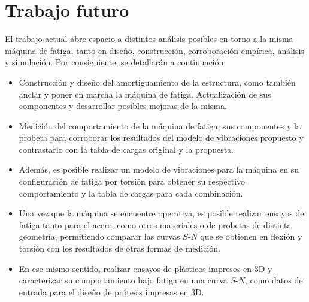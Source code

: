 \section{Trabajo futuro}
El trabajo actual abre espacio a distintos análisis posibles en torno a la misma máquina de fatiga, tanto en diseño, construcción, corroboración empírica, análisis y simulación. Por consiguiente, se detallarán a continuación:
\begin{itemize}
	\item Construcción y diseño del amortiguamiento de la estructura, como también anclar y poner en marcha la máquina de fatiga. Actualización de sus componentes y desarrollar posibles mejoras de la misma.
	\item Medición del comportamiento de la máquina de fatiga, sus componentes y la probeta para corroborar los resultados del modelo de vibraciones propuesto y contrastarlo con la tabla de cargas original y la propuesta.
	\item Además, es posible realizar un modelo de vibraciones para la máquina en su configuración de fatiga por torsión para obtener su respectivo comportamiento y la tabla de cargas para cada combinación.
	\item Una vez que la máquina se encuentre operativa, es posible realizar ensayos de fatiga tanto para el acero, como otros materiales o de probetas de distinta geometría, permitiendo comparar las curvas $S$-$N$ que se obtienen en flexión y torsión con los resultados de otras formas de medición.
	\item En ese mismo sentido, realizar ensayos de plásticos impresos en 3D y caracterizar su comportamiento bajo fatiga en una curva $S$-$N$, como datos de entrada para el diseño de prótesis impresas en 3D.
\end{itemize}










